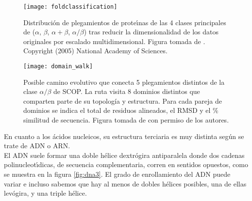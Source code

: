 \begin{figure}
\begin{center} 
\texttt{[image: foldclassification]}
\caption%
{
Distribuci\'{o}n de plegamientos de prote\'\i{}nas de las 4 clases principales de 
 ($\alpha$, $\beta$, $\alpha+\beta$, $\alpha/\beta$)
tras reducir la dimensionalidad de los datos originales por escalado multidimensional.
Figura tomada de \cite{Hou2005}. Copyright (2005) National Academy of Sciences.
}
\label{fig:foldclassif}
\end{center}
\end{figure}


\begin{figure}
\begin{center} 
\texttt{[image: domain\_walk]}
\caption%
{
Posible camino evolutivo que conecta 5 plegamientos distintos de la clase $\alpha/\beta$ de SCOP.
La ruta visita 8 dominios distintos que comparten parte de su topolog\'{i}a y estructura.
Para cada pareja de dominios se indica el total de residuos alineados, el RMSD y el \% similitud de secuencia.
Figura tomada de \cite{Nepomnyachiy2014} con permiso de los autores.
}
\label{fig:foldpaths}
\end{center}
\end{figure}


En cuanto a los \'{a}cidos nucleicos, su estructura terciaria es muy distinta seg\'{u}n se trate de ADN o ARN.\\

El ADN suele formar una doble h\'{e}lice dextr\'{o}gira antiparalela donde dos cadenas polinucleot\'\i{}dicas, de secuencia complementaria,
corren en sentidos opuestos, como se muestra en la figura \ref{fig:dna3}. El grado de enrollamiento 
del ADN puede variar e incluso sabemos que hay al menos 
de dobles h\'{e}lices posibles, una de ellas lev\'{o}gira, y una triple h\'{e}lice.

